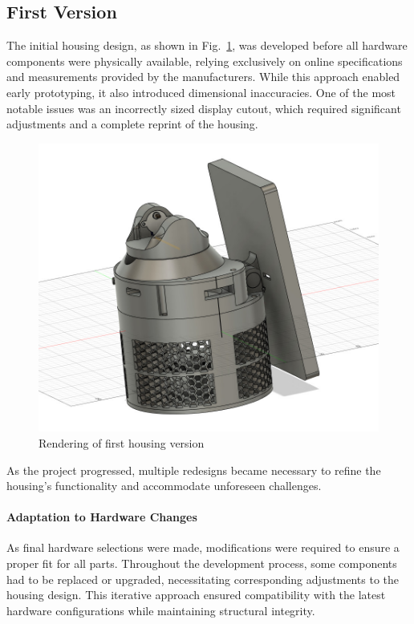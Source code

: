 \subsection{First Version}  

The initial housing design, as shown in Fig.~\ref{fig:firsthousingversion}, was developed before all hardware components were physically available, relying exclusively on online specifications and measurements provided by the manufacturers. While this approach enabled early prototyping, it also introduced dimensional inaccuracies. One of the most notable issues was an incorrectly sized display cutout, which required significant adjustments and a complete reprint of the housing.  

\begin{figure}[H]
	\centering
	\includegraphics[width=1.0\linewidth]{figures/first_housing_version}
	\caption{Rendering of first housing version}
	\label{fig:firsthousingversion}
\end{figure}

As the project progressed, multiple redesigns became necessary to refine the housing’s functionality and accommodate unforeseen challenges.

\paragraph{Adaptation to Hardware Changes}  
As final hardware selections were made, modifications were required to ensure a proper fit for all parts. Throughout the development process, some components had to be replaced or upgraded, necessitating corresponding adjustments to the housing design. This iterative approach ensured compatibility with the latest hardware configurations while maintaining structural integrity.  

